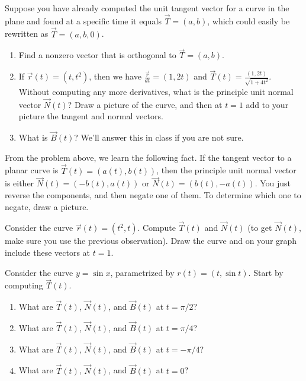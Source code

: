 \begin{problem}
%
 Suppose you have already computed the unit tangent vector for a curve in the plane and found at a specific time it equals $\vec T=(a,b)$, which could easily be rewritten as $\vec T = (a,b,0)$.   
\begin{enumerate}
 \item Find a nonzero vector that is orthogonal to $\vec T=(a,b)$. 
 \item If $\vec r(t) = (t,t^2)$, then we have $\frac{\vec r}{dt} = (1,2t)$ and $\vec T(t) = \frac{(1,2t)}{\sqrt{1+4t^2}}$. Without computing any more derivatives, what is the principle unit normal vector $\vec N(t)$? Draw a picture of the curve, and then at $t=1$ add to your picture the tangent and normal vectors. 
 \item  What is $\vec B(t)$? We'll answer this in class if you are not sure.
\end{enumerate}
\end{problem}

\begin{observation}
From the problem above, we learn the following fact.  If the tangent vector to a planar curve is $\vec T(t) = (a(t),b(t))$, then the principle unit normal vector is either $\vec N(t)=(-b(t),a(t))$ or $\vec N(t)=(b(t),-a(t))$.  You just reverse the components, and then negate one of them.  To determine which one to negate, draw a picture.
\end{observation}

\begin{problem}
Consider the curve $\vec r(t)=(t^2,t)$. Compute $\vec T(t)$ and $\vec N(t)$ (to get $\vec N(t)$, make sure you use the previous observation). Draw the curve and on your graph include these vectors at $t=1$. 
\end{problem}



\begin{problem}
%
 Consider the curve $y=\sin x$, parametrized by $r(t)=(t,\sin t)$. Start by computing $\vec T(t)$.
\begin{enumerate}
 \item What are $\vec T(t)$, $\vec N(t)$, and $\vec B(t)$ at $t=\pi/2$?
 \item What are $\vec T(t)$, $\vec N(t)$, and $\vec B(t)$ at $t=\pi/4$?
 \item What are $\vec T(t)$, $\vec N(t)$, and $\vec B(t)$ at $t=-\pi/4$?
 \item What are $\vec T(t)$, $\vec N(t)$, and $\vec B(t)$ at $t=0$?
\end{enumerate}
\end{problem}


